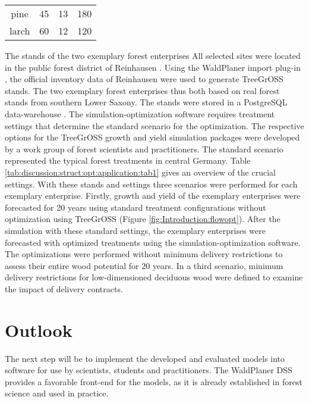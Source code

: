 \begin{table}[h]
\begin{tabular}{cccc}
		pine        & 45                                                                 & 13                                                                                  & 180                                                                                \\
		larch        & 60                                                                 & 12                                                                                  & 120                                                                                \\ \hline
	\end{tabular}
\end{table}

The stands of the two exemplary forest enterprises 
All selected sites were located in the public forest district of Reinhausen \citep{nlf_2017}. Using the WaldPlaner import plug-in \citep[p. 58]{hansen_2014}, the official inventory data of Reinhausen were used to generate TreeGrOSS stands. The two exemplary forest enterprises thus both based on real forest stands from southern Lower Saxony. The stands were stored in a PostgreSQL data-warehouse \citep{eisentraut_2003}. The si\-mu\-la\-tion-op\-ti\-mi\-za\-tion software requires treatment settings that determine the standard scenario for the optimization. The respective options for the TreeGrOSS growth and yield simulation packages were developed by a work group of forest scientists and practitioners. The standard scenario represented the typical forest treatments in central Germany. Table \ref{tab:discussion:struct:opt:application:tab1} gives an overview of the crucial settings. With these stands and settings three scenarios were performed for each exemplary enterprise. Firstly, growth and yield of the exemplary enterprises were forecasted for 20 years using standard treatment configurations without optimization using TreeGrOSS (Figure \ref{fig:Introduction:flowopt}). After the simulation with these standard settings, the exemplary enterprises were forecasted with optimized treatments using the si\-mu\-la\-tion-op\-ti\-mi\-za\-tion software. The optimizations were  performed without minimum delivery restrictions to assess their entire wood potential for 20 years. In a third scenario, minimum delivery restrictions for low-dimensioned deciduous wood were defined to examine the impact of delivery contracts.

\section{Outlook}
\label{sec:discussion:outlook}
The next step will be to implement the developed and evaluated models into software for use by scientists, students and practitioners. The WaldPlaner DSS provides a favorable front-end for the models, as it is already established in forest science and used in practice.

